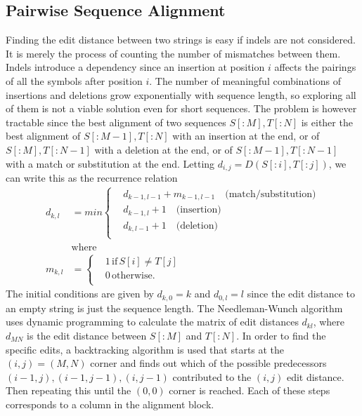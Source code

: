 \subsection{Pairwise Sequence Alignment}
\label{sec:pairwise}
Finding the edit distance between two strings is easy if indels are not considered.
It is merely the process of counting the number of mismatches between them.
Indels introduce a dependency since an insertion at position $i$ affects the pairings of all the symbols after position $i$.
The number of meaningful combinations of insertions and deletions grow exponentially with sequence length, so exploring all of them is not a viable solution even for short sequences.
The problem is however tractable since the best alignment of two sequences $S[:M], T[:N]$ is either the best alignment of $S[:M-1], T[:N]$ with an insertion at the end, or of $S[:M], T[:N-1]$ with a deletion at the end, or of $S[:M-1], T[:N-1]$ with a match or substitution at the end. 
Letting $d_{i,j} = D(S[:i], T[:j])$, we can write this as the recurrence relation
\begin{align*}
  d_{k,l} &= min\begin{cases}
  &d_{k-1,l-1}+m_{k-1, l-1}\quad \text{(match/substitution)}\\
  &d_{k-1,l}+1 \quad \text{(insertion)}\\
  &d_{k, l-1}+1 \quad \text{(deletion)}\\
\end{cases}
  \\
  &\text{where}\\
  m_{k, l} &= \begin{cases} &1 \, \text{if}\, S[i] \neq T[j]\\
                           &0 \, \text{otherwise}.\\
                           \end{cases}
\end{align*}
The initial conditions are given by $d_{k, 0}=k$ and $d_{0,l}=l$ since the edit distance to an empty string is just the sequence length.
The Needleman-Wunch algorithm~\cite{needlemanwunch} uses dynamic programming to calculate the matrix of edit distances $d_{kl}$, where $d_{MN}$ is the edit distance between $S[:M]$ and $T[:N]$.
In order to find the specific edits, a backtracking algorithm is used that starts at the $(i, j) = (M, N)$ corner and finds out which of the possible predecessors $(i-1, j), (i-1, j-1), (i, j-1)$ contributed to the $(i, j)$ edit distance.
Then repeating this until the $(0, 0)$ corner is reached. Each of these steps corresponds to a column in the alignment block.
